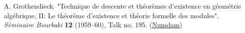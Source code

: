 
  A. Grothendieck.
  "Technique de descente et théorèmes d'existence en géométrie algébrique, II: Le théorème d'existence et théorie formelle des modules".
  \emph{Séminaire Bourbaki} \textbf{12} (1959–60), Talk no. 195.
  (\href{http://www.numdam.org/book-part/SB_1958-1960__5__369_0/}{Numdam})
